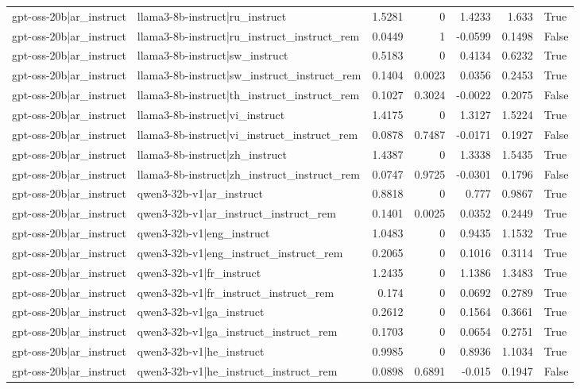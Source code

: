 \begin{table}
\begin{tabular}{l l r r r r l}
gpt-oss-20b|ar_instruct & llama3-8b-instruct|ru_instruct & 1.5281 & 0 & 1.4233 & 1.633 & True \\
gpt-oss-20b|ar_instruct & llama3-8b-instruct|ru_instruct_instruct_rem & 0.0449 & 1 & -0.0599 & 0.1498 & False \\
gpt-oss-20b|ar_instruct & llama3-8b-instruct|sw_instruct & 0.5183 & 0 & 0.4134 & 0.6232 & True \\
gpt-oss-20b|ar_instruct & llama3-8b-instruct|sw_instruct_instruct_rem & 0.1404 & 0.0023 & 0.0356 & 0.2453 & True \\
gpt-oss-20b|ar_instruct & llama3-8b-instruct|th_instruct_instruct_rem & 0.1027 & 0.3024 & -0.0022 & 0.2075 & False \\
gpt-oss-20b|ar_instruct & llama3-8b-instruct|vi_instruct & 1.4175 & 0 & 1.3127 & 1.5224 & True \\
gpt-oss-20b|ar_instruct & llama3-8b-instruct|vi_instruct_instruct_rem & 0.0878 & 0.7487 & -0.0171 & 0.1927 & False \\
gpt-oss-20b|ar_instruct & llama3-8b-instruct|zh_instruct & 1.4387 & 0 & 1.3338 & 1.5435 & True \\
gpt-oss-20b|ar_instruct & llama3-8b-instruct|zh_instruct_instruct_rem & 0.0747 & 0.9725 & -0.0301 & 0.1796 & False \\
gpt-oss-20b|ar_instruct & qwen3-32b-v1|ar_instruct & 0.8818 & 0 & 0.777 & 0.9867 & True \\
gpt-oss-20b|ar_instruct & qwen3-32b-v1|ar_instruct_instruct_rem & 0.1401 & 0.0025 & 0.0352 & 0.2449 & True \\
gpt-oss-20b|ar_instruct & qwen3-32b-v1|eng_instruct & 1.0483 & 0 & 0.9435 & 1.1532 & True \\
gpt-oss-20b|ar_instruct & qwen3-32b-v1|eng_instruct_instruct_rem & 0.2065 & 0 & 0.1016 & 0.3114 & True \\
gpt-oss-20b|ar_instruct & qwen3-32b-v1|fr_instruct & 1.2435 & 0 & 1.1386 & 1.3483 & True \\
gpt-oss-20b|ar_instruct & qwen3-32b-v1|fr_instruct_instruct_rem & 0.174 & 0 & 0.0692 & 0.2789 & True \\
gpt-oss-20b|ar_instruct & qwen3-32b-v1|ga_instruct & 0.2612 & 0 & 0.1564 & 0.3661 & True \\
gpt-oss-20b|ar_instruct & qwen3-32b-v1|ga_instruct_instruct_rem & 0.1703 & 0 & 0.0654 & 0.2751 & True \\
gpt-oss-20b|ar_instruct & qwen3-32b-v1|he_instruct & 0.9985 & 0 & 0.8936 & 1.1034 & True \\
gpt-oss-20b|ar_instruct & qwen3-32b-v1|he_instruct_instruct_rem & 0.0898 & 0.6891 & -0.015 & 0.1947 & False \\

\end{tabular}
\end{table}
